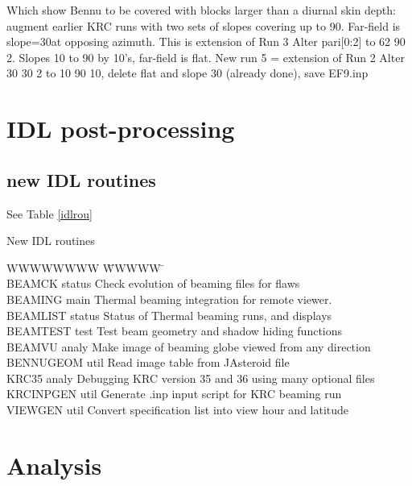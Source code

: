 \documentclass{article}
\begin{document}
Which show Bennu to be covered with blocks larger than a diurnal skin depth:
 augment earlier KRC runs with two sets of slopes covering up to 90\qd.
\qi Far-field is slope=30\qd at opposing azimuth. This is extension of Run 3
\qii Alter pari[0:2] to 62 90 2.
\qi Slopes 10 to 90 by 10's, far-field is flat. New run 5  = extension of Run 2
\qii Alter 30 30 2  to 10 90 10, delete flat and slope 30 (already done), save EF9.inp

\section{IDL post-processing} %

\subsection{new IDL routines}
See Table \ref{idlrou}
 
\begin{table} \caption[IDL routines]{New IDL routines}  
\hrulefill 
\begin{tabbing} 
  WWWWWWWW \= WWWWW \= \kill  \\
  BEAMCK  \> status\>  Check evolution of beaming files for flaws \\
  BEAMING  \> main \>  Thermal beaming integration for remote viewer. \\
  BEAMLIST  \> status\>  Status of Thermal beaming runs, and displays \\
  BEAMTEST \> test \>   Test beam geometry and shadow hiding functions \\
  BEAMVU  \> analy \>  Make image of beaming globe viewed from any direction \\
  BENNUGEOM \> util \>  Read image table from JAsteroid file \\
  KRC35  \> analy\>  Debugging KRC version 35 and 36 using many optional files \\
  KRCINPGEN  \> util \>  Generate .inp input script for KRC beaming run \\
  VIEWGEN  \> util \>  Convert specification list into view hour and latitude \\
\end{tabbing}
\hrulefill \end{table} 


\section{Analysis}
\end{document}
